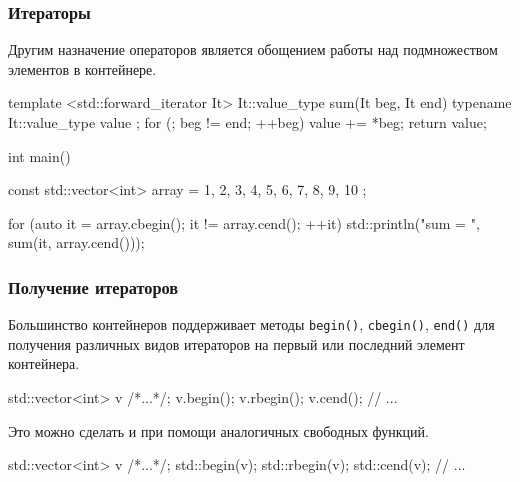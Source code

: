 \documentclass[compress, 8pt]{beamer}
\begin{document}
  \begin{frame}[fragile]

    \frametitle{Итераторы}

    Другим назначение операторов является обощением работы
    над подмножеством элементов в контейнере.

    \begin{mycppinplacelisting}
template <std::forward_iterator It>
It::value_type sum(It beg, It end) {
    typename It::value_type value {};
    for (; beg != end; ++beg) {
        value += *beg;
    }
    return value;
}

int main() {
    const std::vector<int> array = {
        1, 2, 3, 4, 5, 6, 7, 8, 9, 10
    };

    for (auto it = array.cbegin(); it != array.cend(); ++it) {
        std::println("sum = {}", sum(it, array.cend()));
    }
}
    \end{mycppinplacelisting}

  \end{frame}

  \begin{frame}[fragile]

    \frametitle{Получение итераторов}

    Большинство контейнеров поддерживает методы
    \texttt{begin()}, \texttt{cbegin()}, \texttt{end()} для
    получения различных видов итераторов на первый или последний элемент
    контейнера.

    \begin{mycppinplacelisting}
std::vector<int> v {/*...*/};
v.begin();
v.rbegin();
v.cend();
// ...
    \end{mycppinplacelisting}

    Это можно сделать и при помощи аналогичных свободных функций.

    \begin{mycppinplacelisting}
std::vector<int> v {/*...*/};
std::begin(v);
std::rbegin(v);
std::cend(v);
// ...
    \end{mycppinplacelisting}

  \end{frame}
\end{document}
